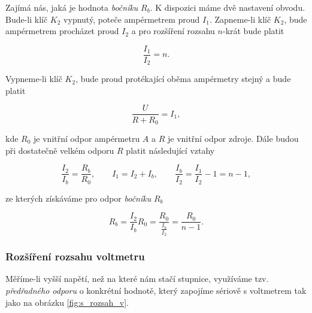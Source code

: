 \documentclass[english]{article}
\begin{document}
Zajímá nás, jaká je hodnota \emph{bočníku} $R_{b}.$ K dispozici máme dvě nastavení obvodu. Bude-li klíč $K_{2}$ vypnutý, poteče ampérmetrem proud $I_{1}$. Zapneme-li klíč $K_{2}$, bude ampérmetrem procházet proud $I_{2}$ a pro rozšíření rozsahu $n$-krát bude platit

\begin{equation} 
\frac{I_1}{I_2} = n.
\label{eq:odovozeni_a_rozsah_podminka_n}
\end{equation}

Vypneme-li klíč $K_{2}$, bude proud protékající oběma ampérmetry stejný a bude platit

\begin{equation} 
\frac{U}{R+R_{0}} = I_{1},
\label{eq:odovozeni_a_rozsah_1}
\end{equation}
 
kde $R_{0}$ je vnitřní odpor ampérmetru $A$ a $R$ je vnitřní odpor zdroje. Dále budou při dostatečně velkém odporu $R$ platit následující vztahy 

\begin{equation} 
\frac{I_{2}}{I_{b}}=\frac{R_{b}}{R_{0}}, \qquad  I_1 = I_2 + I_b, \qquad  \frac{I_{b}}{I_{2}}=\frac{I_{1}}{I_{2}}-1 = n-1,
\label{eq:odovozeni_a_rozsah_2}
\end{equation}

ze kterých získáváme pro odpor \emph{bočníku} $R_{b}$ 

\begin{equation} 
R_{b} = \frac{I_{2}}{I_{b}}R_{0} = \frac{R_{0}}{\frac{I_{b}}{I_{2}}} = \frac{R_{0}}{n-1} .
\label{eq:odovozeni_a_rozsah_3}
\end{equation}

\subsubsection{Rozšíření rozsahu voltmetru}
Měříme-li vyšší napětí, než na které nám stačí stupnice, využíváme tzv. \emph{předřadného odporu} o konkrétní hodnotě, který zapojíme sériově s voltmetrem tak jako na obrázku \ref{fig:s_rozsah_v}.   
\end{document}
